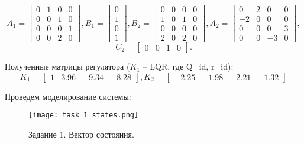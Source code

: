 \begin{equation*}
    A_1 = \begin{bmatrix}
        0 & 1 & 0 & 0 \\
        0 & 0 & 1 & 0 \\
        0 & 0 & 0 & 1 \\
        0 & 0 & 2 & 0
    \end{bmatrix}, 
    B_1 = \begin{bmatrix}
        0 \\ 1 \\ 0 \\ 1
    \end{bmatrix},
    B_2 = \begin{bmatrix}
        0 & 0 & 0 & 0 \\
        1 & 0 & 1 & 0 \\
        0 & 0 & 0 & 0 \\
        2 & 0 & 2 & 0
    \end{bmatrix}, 
    A_2 = \begin{bmatrix}
        0 & 2 & 0 & 0 \\
        -2 & 0 & 0 & 0 \\
        0 & 0 & 0 & 3 \\
        0 & 0 & -3 & 0
    \end{bmatrix}, 
\end{equation*}
\begin{equation*}
    C_2 = \begin{bmatrix}
        0 & 0 & 1 & 0
    \end{bmatrix}.
\end{equation*}

Полученные матрицы регулятора ($K_1$ -- LQR, где Q=id, r=id):
\begin{equation*}
    K_1 = \begin{bmatrix}
        1 & 3.96 & -9.34 & -8.28
    \end{bmatrix},
    K_2 = \begin{bmatrix}
        -2.25 & -1.98 & -2.21 & -1.32
    \end{bmatrix}
\end{equation*}

Проведем моделирование системы:

\begin{figure}[h]
    \centering
    \texttt{[image: task\_1\_states.png]}
    \caption{\label{fig:task4_3_2}Задание 1. Вектор состояния.}
\end{figure}

